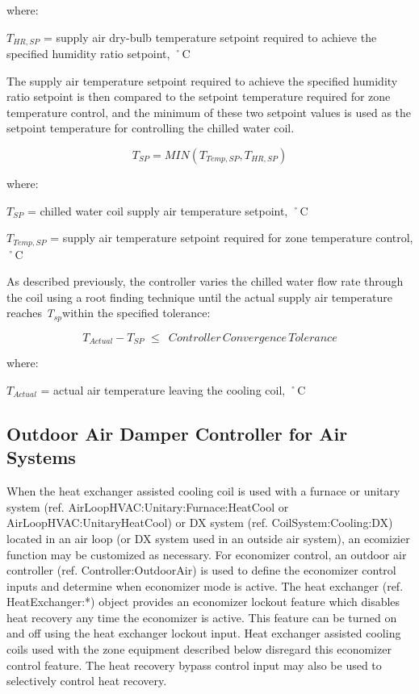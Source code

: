 where:

\({T_{HR,SP}}\) = supply air dry-bulb temperature setpoint required to achieve the specified humidity ratio setpoint, ˚C

The supply air temperature setpoint required to achieve the specified humidity ratio setpoint is then compared to the setpoint temperature required for zone temperature control, and the minimum of these two setpoint values is used as the setpoint temperature for controlling the chilled water coil.

\begin{equation}
{T_{SP}} = MIN\left( {{T_{Temp,SP}},{T_{HR,SP}}} \right)
\end{equation}

where:

\({T_{SP}}\) = chilled water coil supply air temperature setpoint, ˚C

\({T_{Temp,SP}}\) = supply air temperature setpoint required for zone temperature control, ˚C

As described previously, the controller varies the chilled water flow rate through the coil using a root finding technique until the actual supply air temperature reaches \emph{T\(_{sp}\)}within the specified tolerance:

\begin{equation}
{T_{Actual}} - {T_{SP}}\,\, \le \,\,\,Controller\,Convergence\,Tolerance
\end{equation}

where:

\({T_{Actual}}\) = actual air temperature leaving the cooling coil, ˚C

\subsection{Outdoor Air Damper Controller for Air Systems}\label{outdoor-air-damper-controller-for-air-systems}

When the heat exchanger assisted cooling coil is used with a furnace or unitary system (ref. AirLoopHVAC:Unitary:Furnace:HeatCool or AirLoopHVAC:UnitaryHeatCool) or DX system (ref. CoilSystem:Cooling:DX) located in an air loop (or DX system used in an outside air system), an ecomizier function may be customized as necessary. For economizer control, an outdoor air controller (ref. Controller:OutdoorAir) is used to define the economizer control inputs and determine when economizer mode is active. The heat exchanger (ref. HeatExchanger:*) object provides an economizer lockout feature which disables heat recovery any time the economizer is active. This feature can be turned on and off using the heat exchanger lockout input. Heat exchanger assisted cooling coils used with the zone equipment described below disregard this economizer control feature. The heat recovery bypass control input may also be used to selectively control heat recovery.


